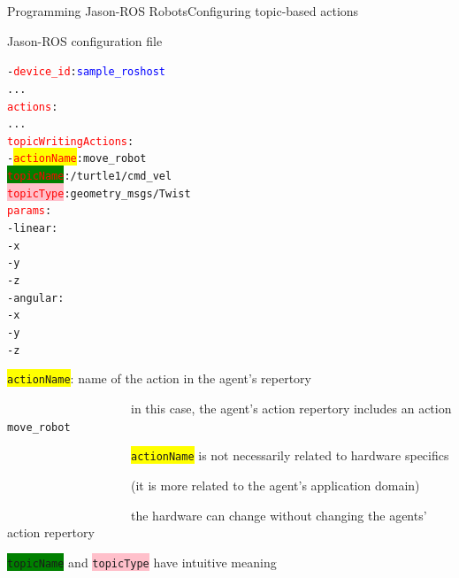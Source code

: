 \documentclass[compress]{beamer}
\newcommand{\yamlkey}[1]{\textcolor{red}{\texttt{#1}}}
\newcommand{\yamlvalue}[1]{\textcolor{blue}{\texttt{#1}}}
\begin{document}
\begin{frame}[fragile]{Programming Jason-ROS Robots}{Configuring topic-based actions}{}


\footnotesize

\begin{block}{Jason-ROS configuration file}


\scriptsize
\begin{alltt}\ssmall
- \yamlkey{device_id}: \yamlvalue{sample_roshost}
     ...
  \yamlkey{actions}:        
        ...
    \yamlkey{topicWritingActions}:          
      - \colorbox{yellow}{\yamlkey{actionName}}: move_robot
        \colorbox{green}{\yamlkey{topicName}}: /turtle1/cmd_vel
        \colorbox{pink}{\yamlkey{topicType}}: geometry_msgs/Twist 
        \yamlkey{params}:
           - linear:
              - x
              - y
              - z
           - angular:
              - x
              - y
              - z     
\end{alltt}
    
\end{block}  

\scriptsize

 \colorbox{yellow}{\texttt{actionName}}: name of the action in the agent's repertory\\
 
  \vspace{-.45cm}
 

 
 \ \ \ \ \ \ \ \ \ \ \ \ \ \ \ \ \ \ \ \ {\tiny in this case, the agent's action repertory includes an action \texttt{move\_robot}}\\
 
 \vspace{-.45cm}
 
 \ \ \ \ \ \ \ \ \ \ \ \ \ \ \ \ \ \ \ \ {\tiny \colorbox{yellow}{\texttt{actionName}} is not necessarily related to hardware specifics}\\
 
  \vspace{-.45cm}
 
 \ \ \ \ \ \ \ \ \ \ \ \ \ \ \ \ \ \ \ \ {\tiny (it is more related to the agent's application domain)}\\
 
  
  \vspace{-.45cm}
 
 \ \ \ \ \ \ \ \ \ \ \ \ \ \ \ \ \ \ \ \ {\tiny the hardware can change without changing the agents' action repertory}\\
 
 \vspace{-.3cm}
 
 \colorbox{green}{\texttt{topicName}} and \colorbox{pink}{\texttt{topicType}} have intuitive meaning

\end{frame}
\end{document}
